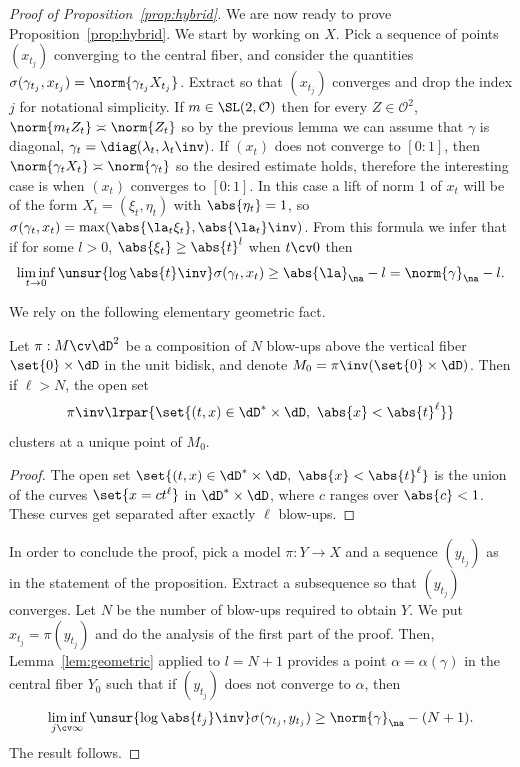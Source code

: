 \begin{proof}[Proof of Proposition~\ref{prop:hybrid}]
We are now ready to prove Proposition~\ref{prop:hybrid}. We start by working on $X$. Pick a sequence of points $(x_{t_j})$ converging to the central fiber, and consider the quantities $\sigma(\gamma_{t_j}, x_{t_j}) = \norm{\gamma_{t_j}X_{t_j}}$. Extract so that $(x_{t_j})$ converges and drop the index $j$ for notational simplicity. If $m\in \SL(2, \mathcal{O})$ then for every $Z\in \mathcal O^2$, $\norm{ m_t Z_t}\asymp \norm{Z_t}$ so by the previous lemma we can assume that $\gamma$ is diagonal, $\gamma_t =\diag(\lambda_t, \lambda_t\inv)$. If $(x_{t})$ does not converge to $[0:1]$, then $\norm{\gamma_{t}X_{t}} \asymp \norm{\gamma_{t}}$ so the desired estimate holds, therefore the interesting case is when $(x_{t})$ converges to $[0:1]$. In this case a lift of norm 1 of $x_t$ will be of the form $X_{t} = (\xi_t, \eta_t)$ with $\abs{\eta_t} = 1$, so $\sigma (\gamma_t, x_t) = \max(\abs{\la_t\xi_t}, \abs{\la_t}\inv)$. From this formula we infer that if for some $l>0$, $\abs{\xi_t} \geq \abs{t}^l$ when $t\cv 0$ then
\[
\liminf_{t\to 0} \unsur{\log\abs{t}\inv} \sigma (\gamma_t, x_t) \geq \abs{\la}_\na -l = \norm{\gamma}_\na -l.
\]

We rely on the following elementary geometric fact.

\begin{lemm}\label{lem:geometric}
Let $\pi:M\cv \dD^2$ be a composition of $N$ blow-ups above the vertical fiber $\set{0}\times \dD$ in the unit bidisk, and denote $M_0 = \pi\inv(\set{0}\times \dD)$.
Then if $\ell>N$, the open set
\[
\pi\inv\lrpar{\set{(t,x)\in \dD^*\times \dD, \ \abs{x}<\abs{t}^\ell}}
\]
clusters at a unique point of $M_0$.
\end{lemm}
\begin{proof}
The open set $\set{(t,x)\in \dD^*\times \dD, \ \abs{x}<\abs{t}^\ell}$ is the union of the curves $\set{ x= c t^\ell}$ in $\dD^*\times \dD$, where $c$ ranges over $\abs{c}<1$. These curves get separated after exactly $\ell$ blow-ups.
\end{proof}

In order to conclude the proof, pick a model $\pi: Y\to X$ and a sequence $(y_{t_j})$ as in the statement of the proposition. Extract a subsequence so that $(y_{t_j})$ converges. Let $N$ be the number of blow-ups required to obtain $Y$. We put $x_{t_j} = \pi(y_{t_j})$ and do the analysis of the first part of the proof. Then, Lemma~\ref{lem:geometric} applied to $l = N+1$ provides a point $\alpha = \alpha(\gamma)$ in the central fiber $Y_0$ such that if $(y_{t_j})$ does not converge to $\alpha$, then
\[
\liminf_{j\cv\infty} \unsur{\log\abs{t_j}\inv} \sigma (\gamma_{t_j}, y_{t_j}) \geq \norm{\gamma}_\na -(N+1).
\]
The result follows.
\end{proof}


